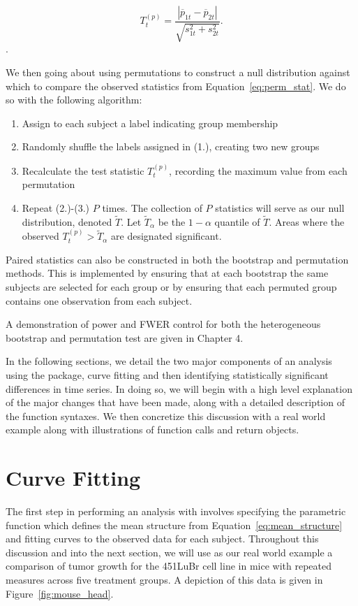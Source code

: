\begin{equation}\label{eq:perm_stat}
T_t^{(p)} = \frac{|\overline{p}_{1t} - \overline{p}_{2t}|}{\sqrt{s_{1t}^2 + s_{2t}^2}}.
\end{equation}.

We then going about using permutations to construct a null distribution against which to compare the observed statistics from Equation~\ref{eq:perm_stat}. We do so with the following algorithm:

\begin{enumerate}
\item Assign to each subject a label indicating group membership
\item Randomly shuffle the labels assigned in (1.), creating two new groups 
\item Recalculate the test statistic $T^{(p)}_t$, recording the maximum value from each permutation
\item Repeat (2.)-(3.) $P$ times. The collection of $P$ statistics will serve as our null distribution, denoted $\widetilde{T}$. Let $\widetilde{T}_{\alpha}$ be the $1 - \alpha$ quantile of $\widetilde{T}$. Areas where the observed $T^{(p)}_t > \widetilde{T}_{\alpha}$ are designated significant.
\end{enumerate}

Paired statistics can also be constructed in both the bootstrap and permutation methods. This is implemented by ensuring that at each bootstrap the same subjects are selected for each group or by ensuring that each permuted group contains one observation from each subject.

A demonstration of power and FWER control for both the heterogeneous bootstrap and permutation test are given in Chapter 4.


In the following sections, we detail the two major components of an analysis using the  package, curve fitting and then identifying statistically significant differences in time series. In doing so, we will begin with a high level explanation of the major changes that have been made, along with a detailed description of the function syntaxes. We then concretize this discussion with a real world example along with illustrations of function calls and return objects.


\section{Curve Fitting}

The first step in performing an analysis with  involves specifying the parametric function which defines the mean structure from Equation~\ref{eq:mean_structure} and fitting curves to the observed data for each subject. Throughout this discussion and into the next section, we will use as our real world example a comparison of tumor growth for the 451LuBr cell line in mice with repeated measures across five treatment groups. A depiction of this data is given in Figure~\ref{fig:mouse_head}.

